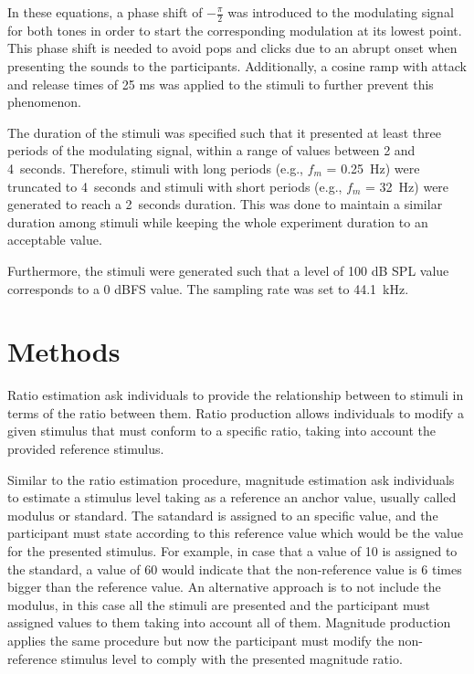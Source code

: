 \documentclass[../main.tex]{subfiles}
\begin{document}
In these equations, a phase shift of $-\frac{\pi}{2}$ was introduced to the
modulating signal for both tones in order to start the corresponding modulation
at its lowest point. This phase shift is needed to avoid pops and clicks due to
an abrupt onset when presenting the sounds to the participants. Additionally, a
cosine ramp with attack and release times of 25 ms was applied to the stimuli to
further prevent this phenomenon.

The duration of the stimuli was specified such that it presented at least three
periods of the modulating signal, within a range of values between 2 and
4~seconds. Therefore, stimuli with long periods (e.g., $f_m$ = 0.25~Hz) were
truncated to 4~seconds and stimuli with short periods (e.g., $f_m$ = 32~Hz) were
generated to reach a 2~seconds duration. This was done to maintain a similar
duration among stimuli while keeping the whole experiment duration to an
acceptable value.

Furthermore, the stimuli were generated such that a level of 100 dB SPL value
corresponds to a 0 dBFS value. The sampling rate was set to 44.1~kHz.

\section{Methods}
\label{sec:methods}


Ratio estimation ask individuals to provide the relationship between to stimuli
in terms of the ratio between them. Ratio production allows individuals to
modify a given stimulus that must conform to a specific ratio, taking into
account the provided reference stimulus.

Similar to the ratio estimation procedure, magnitude estimation ask individuals
to estimate a stimulus level taking as a reference an anchor value, usually
called modulus or standard. The satandard is assigned to an specific value, and
the participant must state according to this reference value which would be
the value for the presented stimulus. For example, in case that a value of 10 is
assigned to the standard, a value of 60 would indicate that the non-reference
value is 6 times bigger than the reference value. An
alternative approach is to not include the modulus, in this case all the stimuli
are presented and the participant must assigned values to them taking into
account all of them. Magnitude production applies the same procedure but now the
participant must modify the non-reference stimulus level to comply with the
presented magnitude ratio.
\end{document}

